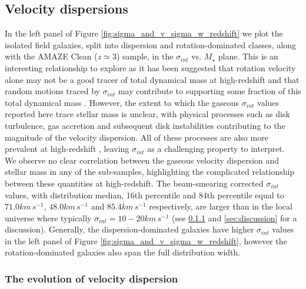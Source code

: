 \documentclass[fleqn,usenatbib]{mnras}
\begin{document}
\subsection{Velocity dispersions}\label{subsec:results_velocity_dispersions}

In the left panel of Figure \ref{fig:sigma_and_v_sigma_w_redshift} we plot the isolated field galaxies, split into dispersion and rotation-dominated classes, along with the AMAZE Clean ($z\simeq3$) sample, in the $\sigma_{int}$ vs. $M_{\star}$ plane.
This is an interesting relationship to explore as it has been suggested that rotation velocity alone may not be a good tracer of total dynamical mass at high-redshift and that random motions traced by $\sigma_{int}$ may contribute to supporting some fraction of this total dynamical mass \citep[e.g.][]{Kassin2007,Burkert2010,Kassin2012,Law2012b,Law2012c,Ubler2017,Genzel2017}.
However, the extent to which the gaseous $\sigma_{int}$ values reported here trace stellar mass is unclear, with physical processes such as disk turbulence, gas accretion and subsequent disk instabilities contributing to the magnitude of the velocity dispersion.
All of these processes are also more prevalent at high-redshift \citep{Genzel2006,ForsterSchreiber2009,Law2009,Genzel2011,Wisnioski2015,Wuyts2016b}, leaving $\sigma_{int}$ as a challenging property to interpret. \\ 


We observe no clear correlation between the gaseous velocity dispersion and stellar mass in any of the sub-samples, highlighting the complicated relationship between these quantities at high-redshift.
The beam-smearing corrected $\sigma_{int}$ values, with distribution median, 16th percentile and 84th percentile equal to $71.0km\,s^{-1}$, $48.0km\,s^{-1}$ and $85.4km\,s^{-1}$ respectively, are larger than in the local universe where typically $\sigma_{int} = 10-20km\,s^{-1}$ \citep{Epinat2008a} (see \cref{subsubsec:sigma_evolution} and \cref{sec:discussion} for a discussion).
Generally, the dispersion-dominated galaxies have higher $\sigma_{int}$ values in the left panel of Figure \ref{fig:sigma_and_v_sigma_w_redshift}, however the rotation-dominated galaxies also span the full distribution width.

\subsubsection{The evolution of velocity dispersion}\label{subsubsec:sigma_evolution}
\end{document}
